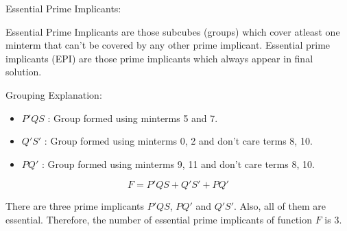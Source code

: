 \documentclass[12pt]{article}
\begin{document}
Essential Prime Implicants:\newline

Essential Prime Implicants are those subcubes (groups) which cover atleast one minterm that can’t be covered by any other prime implicant. Essential prime implicants (EPI) are those prime implicants which always appear in final solution.\newline

Grouping Explanation:

\begin{itemize}
    \item {$P'QS$} : Group formed using minterms 5 and 7.
    
    \item {$Q'S'$} : Group formed using minterms 0, 2 and don't care terms 8, 10.
    
    \item {$PQ'$} : Group formed using minterms 9, 11 and don't care terms 8, 10.
\end{itemize}

\begin{equation*}
F = P'QS + Q'S' + PQ'
\end{equation*}

There are three prime implicants $P'QS$, $PQ'$ and $Q'S'$. Also, all of them are essential. Therefore, the number of essential prime implicants of function $F$ is
3.
\end{document}

